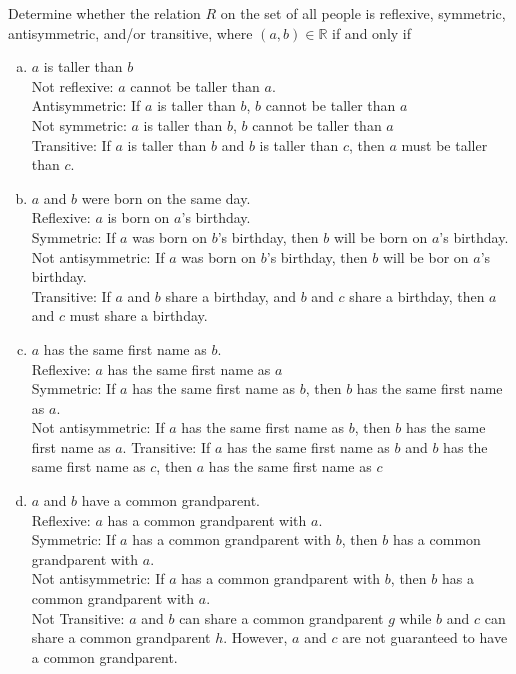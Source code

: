 \documentclass[12pt]{article}  %
\begin{document}
\noindent
Determine whether the relation $R$ on the set of all people is reflexive, symmetric, antisymmetric, and/or transitive, where $(a,b)\in\mathbb{R}$ if and only if
\begin{enumerate}[a)]
    \item $a$ is taller than $b$\\
    Not reflexive: $a$ cannot be taller than $a$.\\
    Antisymmetric: If $a$ is taller than $b$, $b$ cannot be taller than $a$\\
    Not symmetric: $a$ is taller than $b$, $b$ cannot be taller than $a$\\
    Transitive: If $a$ is taller than $b$ and $b$ is taller than $c$, then $a$ must be taller than $c$.
    
    \item $a$ and $b$ were born on the same day.\\
    Reflexive: $a$ is born on $a$'s birthday.\\
    Symmetric: If $a$ was born on $b$’s birthday, then $b$ will be born on $a$’s birthday.\\
    Not antisymmetric: If $a$ was born on $b$'s birthday, then $b$ will be bor on $a$'s birthday.\\
    Transitive: If $a$ and $b$ share a birthday, and $b$ and $c$ share a birthday, then $a$ and $c$ must share a birthday.
    
    \item $a$ has the same first name as $b$.\\
    Reflexive: $a$ has the same first name as $a$\\
    Symmetric: If $a$ has the same first name as $b$, then $b$ has the same first name as $a$.\\
    Not antisymmetric: If $a$ has the same first name as $b$, then $b$ has the same first name as $a$.
    Transitive: If $a$ has the same first name as $b$ and $b$ has the same first name as $c$, then $a$ has the same first name as $c$
    
    \item $a$ and $b$ have a common grandparent.\\
    Reflexive: $a$ has a common grandparent with $a$.\\
    Symmetric: If $a$ has a common grandparent with $b$, then $b$ has a common grandparent with $a$.\\
    Not antisymmetric: If $a$ has a common grandparent with $b$, then $b$ has a common grandparent with $a$.\\
    Not Transitive: $a$ and $b$ can share a common grandparent $g$ while $b$ and $c$ can share a common grandparent $h$. However, $a$ and $c$ are not guaranteed to have a common grandparent.
\end{enumerate}
\end{document}
